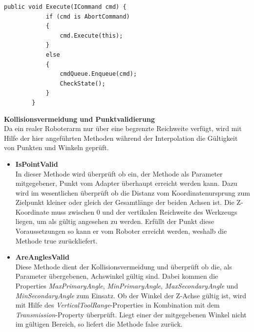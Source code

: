 \begin{lstlisting}[language = CSharp, captionpos=b, caption={Die Execute-Methode des IAdapters}]
public void Execute(ICommand cmd) {
            if (cmd is AbortCommand)
            {
                cmd.Execute(this);
            }
            else
            {
                cmdQueue.Enqueue(cmd);
                CheckState();
            }
        }
\end{lstlisting}


\textbf{Kollisionsvermeidung und Punktvalidierung}\\
Da ein realer Roboterarm nur über eine begrenzte Reichweite verfügt, wird mit Hilfe der hier angeführten Methoden während der Interpolation die Gültigkeit von Punkten und Winkeln geprüft.
\begin{itemize} 
\item \textbf{IsPointValid}\\
In dieser Methode wird überprüft ob ein, der Methode als Parameter mitgegebener, Punkt vom Adapter überhaupt erreicht werden kann. Dazu wird im wesentlichen überprüft ob die Distanz vom Koordinatenursprung zum Zielpunkt kleiner oder gleich der Gesamtlänge der beiden Achsen ist. Die Z-Koordinate muss zwischen 0 und der vertikalen Reichweite des Werkzeugs liegen, um als gültig angesehen zu werden. Erfüllt der Punkt diese Voraussetzungen so kann er vom Roboter erreicht werden, weshalb die Methode true zurückliefert.
\item \textbf{AreAnglesValid}\\
Diese Methode dient der Kollisionsvermeidung und überprüft ob die, als Parameter übergebenen, Achswinkel gültig sind. Dabei kommen die Properties \textit{MaxPrimaryAngle}, \textit{MinPrimaryAngle}, \textit{MaxSecondaryAngle} und \textit{MinSecondaryAngle} zum Einsatz. Ob der Winkel der Z-Achse gültig ist, wird mit Hilfe des \textit{VerticalToolRange}-Properties in Kombination mit dem \textit{Transmission}-Property überprüft. Liegt einer der mitgegebenen Winkel nicht im gültigen Bereich, so liefert die Methode false zurück.
\end{itemize}

